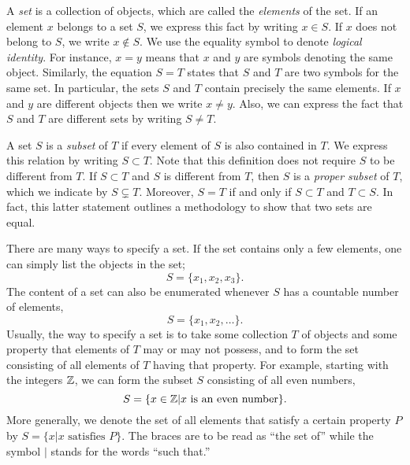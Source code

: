 A \emph{set} is a collection of objects, which are called the \emph{elements} of the set.
If an element $x$ belongs to a set $S$, we express this fact by writing $x \in S$.
If $x$ does not belong to $S$, we write $x \notin S$.
We use the equality symbol to denote \emph{logical identity}.
For instance, $x = y$ means that $x$ and $y$ are symbols denoting the same object.
Similarly, the equation $S = T$ states that $S$ and $T$ are two symbols for the same set.
In particular, the sets $S$ and $T$ contain precisely the same elements.
If $x$ and $y$ are different objects then we write $x \neq y$.
Also, we can express the fact that $S$ and $T$ are different sets by writing $S \neq T$.

A set $S$ is a \emph{subset} of $T$ if every element of $S$ is also contained in $T$.
We express this relation by writing $S \subset T$.
Note that this definition does not require $S$ to be different from $T$.
If $S \subset T$ and $S$ is different from $T$, then $S$ is a \emph{proper subset} of $T$, which we indicate by $S \subsetneq T$.
Moreover, $S = T$ if and only if $S \subset T$ and $T \subset S$.
In fact, this latter statement outlines a methodology to show that two sets are equal.

There are many ways to specify a set.
If the set contains only a few elements, one can simply list the objects in the set;
\begin{equation*}
S = \{ x_1, x_2, x_3 \} .
\end{equation*}
The content of a set can also be enumerated whenever $S$ has a countable number of elements,
\begin{equation*}
S = \{ x_1, x_2, \ldots \} .
\end{equation*}
Usually, the way to specify a set is to take some collection $T$ of objects and some property that elements of $T$ may or may not possess, and to form the set consisting of all elements of $T$ having that property.
For example, starting with the integers $\mathbb{Z}$, we can form the subset $S$ consisting of all even numbers,
\begin{equation*}
S = \{ x \in \mathbb{Z} | x \text{ is an even number} \}.
\end{equation*}
More generally, we denote the set of all elements that satisfy a certain property $P$ by $S = \{ x | x \text{ satisfies } P \}$.
The braces are to be read as ``the set of'' while the symbol $|$ stands for the words ``such that.''


